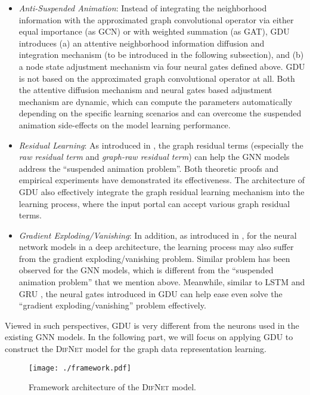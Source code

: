 \documentclass{article}
\newcommand{\our}{\textsc{DifNet}}
\newcommand{\gdu}{\textsc{GDU}}
\newcommand{\gcn}{\textsc{GCN}}
\newcommand{\gat}{\textsc{GAT}}
\begin{document}
\begin{itemize}
\item \textit{Anti-Suspended Animation}: Instead of integrating the neighborhood information with the approximated graph convolutional operator via either equal importance (as {\gcn}) or with weighted summation (as {\gat}), {\gdu} introduces (a) an attentive neighborhood information diffusion and integration mechanism (to be introduced in the following subsection), and (b) a node state adjustment mechanism via four neural gates defined above. {\gdu} is not based on the approximated graph convolutional operator at all. Both the attentive diffusion mechanism and neural gates based adjustment mechanism are dynamic, which can compute the parameters automatically depending on the specific learning scenarios and can overcome the suspended animation side-effects on the model learning performance.

\item \textit{Residual Learning}: As introduced in \cite{Zhang_GResNet_19}, the graph residual terms (especially the \textit{raw residual term} and \textit{graph-raw residual term}) can help the GNN models address the ``suspended animation problem''. Both theoretic proofs and empirical experiments have demonstrated its effectiveness. The architecture of {\gdu} also effectively integrate the graph residual learning mechanism into the learning process, where the input portal  can accept various graph residual terms. 

\item \textit{Gradient Exploding/Vanishing}: In addition, as introduced in \cite{Hochreiter_Long_97}, for the neural network models in a deep architecture, the learning process may also suffer from the gradient exploding/vanishing problem. Similar problem has been observed for the GNN models, which is different from the ``suspended animation problem'' that we mention above. Meanwhile, similar to LSTM \cite{Hochreiter_Long_97} and GRU \cite{Chung_Empirical_14}, the neural gates introduced in {\gdu} can help ease even solve the ``gradient exploding/vanishing'' problem effectively.

\end{itemize}

Viewed in such perspectives, {\gdu} is very different from the neurons used in the existing GNN models. In the following part, we will focus on applying {\gdu} to construct the {\our} model for the graph data representation learning.

\begin{figure}
    \centering
    \begin{minipage}{.5\textwidth}
    	\texttt{[image: ./framework.pdf]}
     \end{minipage}\caption{Framework architecture of the {\our} model.}
    	\label{fig:framework}
\end{figure}
\end{document}
